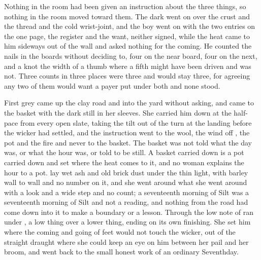 Nothing in the room had been given an instruction about the three things, so nothing in the room moved toward them. The dark went on over the crust and the thread and the cold wrist-joint, and the boy went on with the two entries on the one page, the register and the want, neither signed, while the heat came to him sideways out of the wall and asked nothing for the coming. He counted the nails in the boards without deciding to, four on the near board, four on the next, and a knot the width of a thumb where a fifth might have been driven and was not. Three counts in three places were three and would stay three, for agreeing any two of them would want a payer put under both and none stood.

\scenebreak

First grey came up the clay road and into the yard without asking, and  came to the basket with the dark still in her sleeves. She carried him down  at the half-pace from every open slate, taking the tilt out of the turn at the landing before the wicker had settled, and the instruction went to the wool, the wind off , the pot and the fire and never to the basket. The basket was not told what the day was, or what the hour was, or told to be still. A basket carried down is a pot carried down and set where the heat comes to it, and no woman explains the hour to a pot.  lay wet ash and old brick dust under the thin light, with barley wall to wall and no number on it, and she went around what she went around with a look and a wide step and no count; a seventeenth morning of Silt was a seventeenth morning of Silt and not a reading, and nothing from the road had come down into it to make a boundary or a lesson. Through  the low note of  ran under , a low thing over a lower thing, ending on its own finishing. She set him where the coming and going of feet would not touch the wicker, out of the straight draught where she could keep an eye on him between her pail and her broom, and went back to the small honest work of an ordinary Seventhday.

